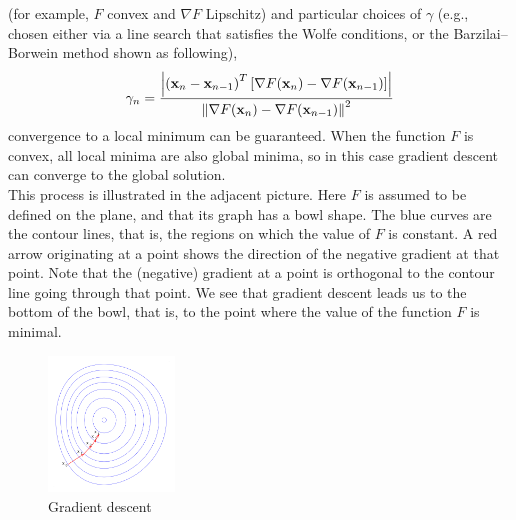 \documentclass{article}
\begin{document}
 (for example, 
${\displaystyle F}$ 
convex and 
${\displaystyle \nabla F}$
 Lipschitz) and particular choices of 
${\displaystyle \gamma }$ (e.g., chosen either via a line search that satisfies the Wolfe conditions, or the Barzilai–Borwein method shown as following),\\
\begin{equation}\notag
\begin{aligned}
{\displaystyle \gamma _{n}={\frac {\left|\left(\mathbf {x} _{n}-\mathbf {x} _{n-1}\right)^{T}\left[\nabla F(\mathbf {x} _{n})-\nabla F(\mathbf {x} _{n-1})\right]\right|}{\left\|\nabla F(\mathbf {x} _{n})-\nabla F(\mathbf {x} _{n-1})\right\|^{2}}}}
\end{aligned}
\end{equation}
convergence to a local minimum can be guaranteed. When the function
 ${\displaystyle F}$ 
is convex, all local minima are also global minima, so in this case gradient descent can converge to the global solution.\\[10pt]
This process is illustrated in the adjacent picture. Here 
${\displaystyle F}$
 is assumed to be defined on the plane, and that its graph has a bowl shape. The blue curves are the contour lines, that is, the regions on which the value of 
${\displaystyle F}$ 
is constant. A red arrow originating at a point shows the direction of the negative gradient at that point. Note that the (negative) gradient at a point is orthogonal to the contour line going through that point. We see that gradient descent leads us to the bottom of the bowl, that is, to the point where the value of the function 
${\displaystyle F}$ 
is minimal.\\
\begin{figure}[H] 
\centering 
\includegraphics[width=0.3\textwidth]{Gradient_descent.svg.png} 
\caption{Gradient descent} 
\label{Fig.main5}
\end{figure}
\end{document}
